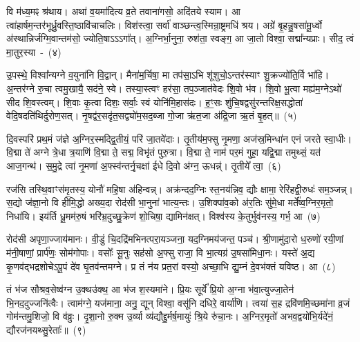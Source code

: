 वि म॑ध्य॒मꣴ श्र॑थाय। अथा॑ व॒यमा॑दित्य व्र॒ते तवाना॑गसो॒ अदि॑तये स्याम। आ त्वा॑हार्\mbox{}षम॒न्तर॑भूर्ध्रु॒वस्ति॒ष्ठा\-वि॑चाचलिः। विश॑स्त्वा॒ सर्वा॑ वाञ्छन्त्व॒स्मिन्रा॒ष्ट्रमधि॑ श्रय। अग्रे॑ बृ॒हन्नु॒षसा॑मू॒र्ध्वो अ॑स्थान्निर्जग्मि॒वान्तम॑सो॒ ज्योति॒षा\-ऽऽ\-ऽ\-गा᳚त्। अ॒ग्निर्भा॒नुना॒ रुश॑ता॒ स्वङ्ग॒ आ जा॒तो विश्वा॒ सद्मा᳚न्यप्राः। सीद॒ त्वं मा॒तुर॒स्या~-~(४)\ip

उ॒पस्थे॒ विश्वा᳚न्यग्ने व॒युना॑नि वि॒द्वान्। मैना॑म॒र्चिषा॒ मा तप॑सा॒\-ऽभि शू॑शुचो॒\-ऽन्तर॑स्याꣳ शु॒क्रज्यो॑ति॒र्वि भा॑हि। अ॒न्तर॑ग्ने रु॒चा त्वमु॒खायै॒ सद॑ने॒ स्वे। तस्या॒स्त्वꣳ हर॑सा॒ तप॒ञ्जात॑वेदः शि॒वो भ॑व। शि॒वो भू॒त्वा मह्य॑म॒ग्ने\-ऽथो॑ सीद शि॒वस्त्वम्। शि॒वाः कृ॒त्वा दिशः॒ सर्वाः॒ स्वं योनि॑मि॒हास॑दः। ह॒ꣳ॒सः शु॑चि॒षद्वसु॑रन्तरिक्ष॒सद्धोता॑ वेदि॒षदति॑थिर्दुरोण॒सत्। नृ॒षद्व॑र॒सदृ॑त॒सद्व्यो॑म॒सद॒ब्जा गो॒जा ऋ॑त॒जा अ॑द्रि॒जा ऋ॒तं बृ॒हत्॥~(५)\ip

{\anuvakamend[{दिव॒मनु॒ वि क्र॑मस्व॒ निर्भ॑क्तः॒ स यं द्वि॒ष्मो विष्णो॒र्धने॒नाग्ने॑\-ऽध॒मम॒स्याः शु॑चि॒षथ्षोड॑श च}]}

दि॒वस्परि॑ प्रथ॒मं ज॑ज्ञे अ॒ग्निर॒स्मद्द्वि॒तीयं॒ परि॑ जा॒तवे॑दाः। तृ॒तीय॑म॒फ्सु नृ॒मणा॒ अज॑स्र॒मिन्धा॑न एनं जरते स्वा॒धीः। वि॒द्मा ते॑ अग्ने त्रे॒धा त्र॒याणि॑ वि॒द्मा ते॒ सद्म॒ विभृ॑तं पुरु॒त्रा। वि॒द्मा ते॒ नाम॑ पर॒मं गुहा॒ यद्वि॒द्मा तमुथ्सं॒ यत॑ आज॒गन्थ॑। स॒मु॒द्रे त्वा॑ नृ॒मणा॑ अ॒फ्स्व॑न्तर्नृ॒चक्षा॑ ईधे दि॒वो अ॑ग्न॒ ऊधन्न्॑। तृ॒तीये᳚ त्वा॒~(६)\ip

रज॑सि तस्थि॒वाꣳस॑मृ॒तस्य॒ योनौ॑ महि॒षा अ॑हिन्वन्न्। अक्र॑न्दद॒ग्निः स्त॒नय॑न्निव॒ द्यौः क्षामा॒ रेरि॑हद्वी॒रुधः॑ सम॒ञ्जन्न्। स॒द्यो ज॑ज्ञा॒नो वि हीमि॒द्धो अख्य॒दा रोद॑सी भा॒नुना॑ भात्य॒न्तः। उ॒शिक्पा॑व॒को अ॑र॒तिः सु॑मे॒धा मर्ते᳚ष्व॒ग्निर॒मृतो॒ निधा॑यि। इय॑र्ति धू॒मम॑रु॒षं भरि॑भ्र॒दुच्छु॒क्रेण॑ शो॒चिषा॒ द्यामिन॑क्षत्। विश्व॑स्य के॒तुर्भुव॑नस्य॒ गर्भ॒ आ~(७)\ip

रोद॑सी अपृणा॒ज्जाय॑मानः। वी॒डुं चि॒दद्रि॑मभिनत्परा॒यञ्जना॒ यद॒ग्निमय॑जन्त॒ पञ्च॑। श्री॒णामु॑दा॒रो ध॒रुणो॑ रयी॒णां म॑नी॒षाणां॒ प्रार्प॑णः॒ सोम॑गोपाः। वसोः᳚ सू॒नुः सह॑सो अ॒फ्सु राजा॒ वि भा॒त्यग्र॑ उ॒षसा॑मिधा॒नः। यस्ते॑ अ॒द्य कृ॒णव॑द्भद्रशोचे\-ऽपू॒पं दे॑व घृ॒तव॑न्तमग्ने। प्र तं न॑य प्रत॒रां वस्यो॒ अच्छा॒भि द्यु॒म्नं दे॒वभ॑क्तं यविष्ठ। आ~(८)\ip

तं भ॑ज सौश्रव॒सेष्व॑ग्न उ॒क्थउ॑क्थ॒ आ भ॑ज श॒स्यमा॑ने। प्रि॒यः सूर्ये᳚ प्रि॒यो अ॒ग्ना भ॑वा॒त्युज्जा॒तेन॑ भि॒नद॒दुज्जनि॑त्वैः। त्वाम॑ग्ने॒ यज॑माना॒ अनु॒ द्यून् विश्वा॒ वसू॑नि दधिरे॒ वार्या॑णि। त्वया॑ स॒ह द्रवि॑णमि॒च्छमा॑ना व्र॒जं गोम॑न्तमु॒शिजो॒ वि व॑व्रुः। दृ॒शा॒नो रु॒क्म उ॒र्व्या व्य॑द्यौद्दु॒र्मर्\mbox{}ष॒मायुः॑ श्रि॒ये रु॑चा॒नः। अ॒ग्निर॒मृतो॑ अभव॒द्वयो॑भि॒र्यदे॑नं॒ द्यौरज॑नयथ्सु॒रेताः᳚॥~(९)\ip

